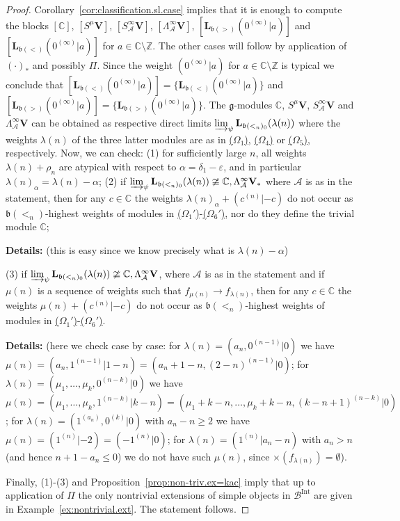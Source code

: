 \documentclass[12pt]{amsart}
\newcommand\C{\mathbb{C}}
\newcommand\Z{\mathbb{Z}}
\newcommand\g{\mathfrak{g}}
\newcommand\fb{\mathfrak{b}}
\newcommand\cA{\mathcal{A}}
\newcommand\cB{\mathcal{B}}
\newcommand\bV{\mathbf{V}}
\newcommand\bL{\mathbf{L}}
\DeclareMathOperator{\Int}{Int}
\theoremstyle{plain}
\theoremstyle{definition}
\numberwithin{equation}{section}
\newcommand{\details}[1]{\smallskip \color{blue} \begin{footnotesize} \textbf{Details:} #1 \end{footnotesize} \color{black}}
\newcommand{\details}[1]{}
\begin{document}
\begin{proof}
Corollary~\ref{cor:classification.sl.case} implies that it is enough to compute the blocks $[\C]$, $[S^\mu \bV]$, $[S_\cA^\infty \bV]$, $[\Lambda_\cA^{\infty} \bV]$, $[\bL_{\fb(>)}(0^{(\infty)}|a)]$ and $[\bL_{\fb(<)}(0^{(\infty)}|a)]$ for $a\in \C\setminus \Z$. The other cases will follow by application of $(\cdot)_*$ and possibly $\Pi$. Since the weight $(0^{(\infty)}|a)$ for $a\in \C\setminus \Z$ is typical we conclude that $[\bL_{\fb(<)}(0^{(\infty)}|a)]=\{\bL_{\fb(<)}(0^{(\infty)}|a)\}$ and $[\bL_{\fb(>)}(0^{(\infty)}|a)]=\{\bL_{\fb(>)}(0^{(\infty)}|a)\}$. The $\g$-modules $\C$, $S^\mu \bV$, $S_\cA^\infty \bV$ and $\Lambda_\cA^{\infty} \bV$ can be obtained as respective direct limits $\varinjlim_\psi \bL_{\fb(<_n)_0}(\lambda(n))$ where the weights $\lambda(n)$ of the three latter modules are as in {\rm \hyperref[sym.type.mod]{($\Omega_1$)}, \hyperref[ext.type.mod.dual]{($\Omega_4$)}} or {\rm \hyperref[partition.type.mod]{($\Omega_5$)}}, respectively. Now, we can check: (1) for sufficiently large $n$, all weights $\lambda(n)+\rho_n$ are atypical with respect to $\alpha = \delta_1-\varepsilon$, and in particular $\lambda(n)_\alpha = \lambda(n)-\alpha$; (2) if $\varinjlim_\psi \bL_{\fb(<_n)_0}(\lambda(n))\ncong \C, \Lambda_\cA^{\infty} \bV_*$ where $\cA$ is as in the statement, then for any $c\in \C$ the weights $\lambda(n)_\alpha + (c^{(n)}|-c)$ do not occur as $\fb(<_n)$-highest weights of modules in {\rm \hyperref[sym.type.mod]{($\Omega_1'$)}-\hyperref[partition.type.mod.dual]{($\Omega_6'$)}}, nor do they define the trivial module $\C$; {\details{(this is easy since we know precisely what is $\lambda(n)-\alpha$)}} (3) if $\varinjlim_\psi \bL_{\fb(<_n)_0}(\lambda(n))\ncong \C, \Lambda_\cA^{\infty} \bV$, where $\cA$ is as in the statement and if $\mu(n)$ is a sequence of weights such that $f_{\mu(n)} \to f_{\lambda(n)}$, then for any $c\in \C$ the weights $\mu(n)+(c^{(n)}|-c)$ do not occur as $\fb(<_n)$-highest weights of modules in {\rm \hyperref[sym.type.mod]{($\Omega_1'$)}-\hyperref[partition.type.mod.dual]{($\Omega_6'$)}}. {\details{(here we check case by case: for $\lambda(n)=(a_n, 0^{(n-1)}|0)$ we have $\mu(n) = (a_n,1^{(n-1)}|1-n)=(a_n+1-n, (2-n)^{(n-1)}|0)$; for $\lambda(n)=(\mu_1,\ldots, \mu_k, 0^{(n-k)}|0)$ we have $\mu(n) = (\mu_1,\ldots, \mu_k, 1^{(n-k)}|k-n)= (\mu_1+k-n,\ldots, \mu_k+k-n, (k-n+1)^{(n-k)}|0)$; for $\lambda(n)=(1^{(a_n)}, 0^{(k)}|0)$ with $a_n-n\geq 2$ we have $\mu(n) = (1^{(n)}|-2)= (-1^{(n)}|0)$; for $\lambda(n)=(1^{(n)}|a_n-n)$ with $a_n>n$ (and hence $n+1-a_n\leq 0$) we do not have such $\mu(n)$, since $\times (f_{\lambda(n)})=\emptyset$).}} Finally, (1)-(3) and Proposition~\ref{prop:non-triv.ex=kac} imply that up to application of $\Pi$ the only nontrivial extensions of simple objects in $\cB^{\Int}$ are given in Example~\ref{ex:nontrivial.ext}. The statement follows.
\end{proof}
\end{document}
